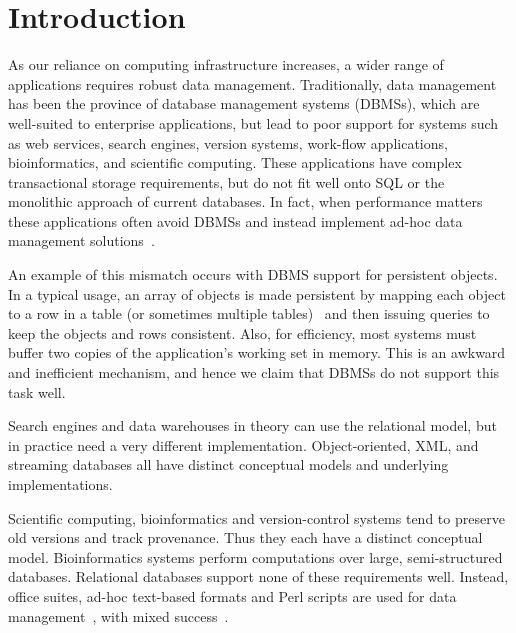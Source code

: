\documentclass[letterpaper,twocolumn,10pt]{article}
\begin{document}




\section{Introduction}
\label{sec:intro}
As our reliance on computing infrastructure increases, a wider range
of applications requires robust data management.  Traditionally, data
management has been the province of database management systems
(DBMSs), which are well-suited to enterprise applications, but lead to
poor support for systems such as web services, search engines, version
systems, work-flow applications, bioinformatics, and
scientific computing.  These applications have complex transactional
storage requirements, but do not fit well onto SQL or the monolithic
approach of current databases.  In fact, when performance matters
these applications often avoid DBMSs and instead implement ad-hoc data
management solutions~\cite{SNS}.

An example of this mismatch occurs with DBMS support for persistent objects.
In a typical usage, an array of objects is made persistent by mapping
each object to a row in a table (or sometimes multiple
tables)~\cite{hibernate} and then issuing queries to keep the objects
and rows consistent. 
Also, for efficiency, most systems
must buffer two copies of the application's working set in memory.
This is an awkward and inefficient mechanism, and hence we claim that
DBMSs do not support this task well.

Search engines and data warehouses in theory can use the relational
model, but in practice need a very different implementation.
Object-oriented, XML, and streaming databases all have distinct
conceptual models and underlying implementations.

Scientific computing, bioinformatics and version-control systems tend
to preserve old versions and track provenance.  Thus they each have a
distinct conceptual model.  Bioinformatics systems perform
computations over large, semi-structured databases.  Relational
databases support none of these requirements well. Instead, office
suites, ad-hoc text-based formats and Perl scripts are used for data
management~\cite{perl}, with mixed success~\cite{excel}.
\end{document}
